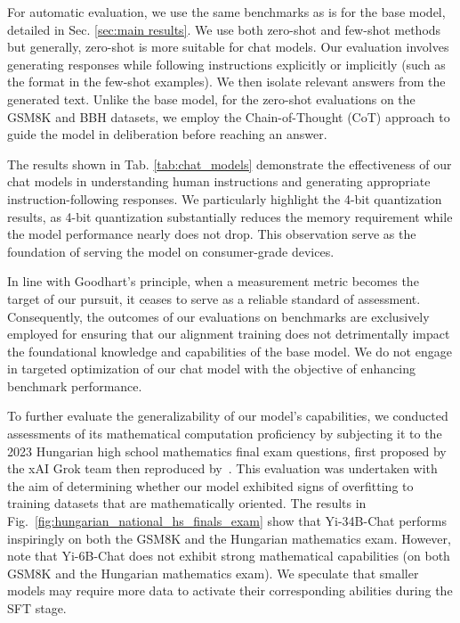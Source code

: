 \documentclass[numbers,sort&compress]{article}
\begin{document}
For automatic evaluation, we use the same benchmarks as is for the base model, detailed in Sec. \ref{sec:main results}.
We use both zero-shot and few-shot methods but generally, zero-shot is more suitable for chat models. Our evaluation involves generating responses while following instructions explicitly or implicitly (such as the format in the few-shot examples). We then isolate relevant answers from the generated text. Unlike the base model, for the zero-shot evaluations on the GSM8K and BBH datasets, we employ the Chain-of-Thought (CoT) approach to guide the model in deliberation before reaching an answer.

The results shown in Tab. \ref{tab:chat_models} demonstrate the effectiveness of our chat models in understanding human instructions and generating appropriate instruction-following responses. 
We particularly highlight the 4-bit quantization results, as 4-bit quantization substantially reduces the memory requirement while the model performance nearly does not drop. 
This observation serve as the foundation of serving the model on consumer-grade devices. 

In line with Goodhart's principle, when a measurement metric becomes the target of our pursuit, it ceases to serve as a reliable standard of assessment. Consequently, the outcomes of our evaluations on benchmarks are exclusively employed for ensuring that our alignment training does not detrimentally impact the foundational knowledge and capabilities of the base model. We do not engage in targeted optimization of our chat model with the objective of enhancing benchmark performance.

To further evaluate the generalizability of our model's capabilities, we conducted assessments of its mathematical computation proficiency by subjecting it to the 2023 Hungarian high school mathematics final exam questions, first proposed by the xAI Grok team then reproduced by~\citet{testing_language_models_on_a_held_out_high_school_national_finals_exam}. This evaluation was undertaken with the aim of determining whether our model exhibited signs of overfitting to training datasets that are mathematically oriented.
The results in Fig.~\ref{fig:hungarian_national_hs_finals_exam} show that Yi-34B-Chat performs inspiringly on both the GSM8K and the Hungarian mathematics exam. However, note that Yi-6B-Chat does not exhibit strong mathematical capabilities (on both GSM8K and the Hungarian mathematics exam). We speculate that smaller models may require more data to activate their corresponding abilities during the SFT stage.
\end{document}
